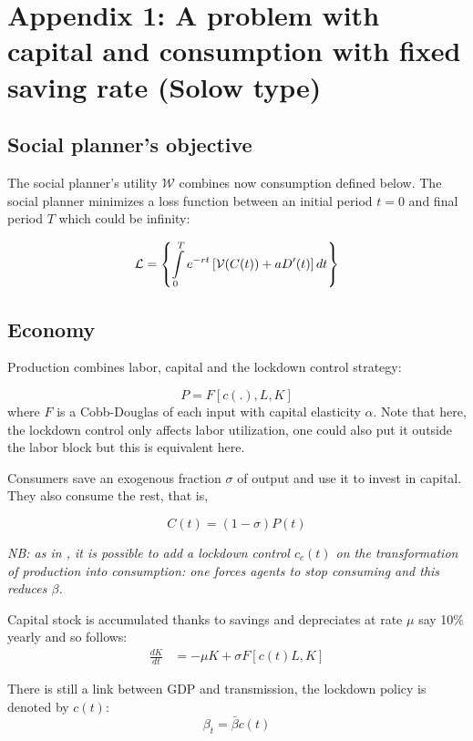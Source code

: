 \documentclass{amsart}
\begin{document}
\clearpage
\small{


}
\newpage


\section*{{Appendix 1: A problem with capital and consumption with fixed
saving rate (Solow type)}}

\subsection*{{Social planner's objective}}

{The social planner's utility $\mathcal{W}$ combines
now consumption defined below. The social planner minimizes a loss
function between an initial period $t=0$ and final period $T$ which could be infinity:}

{
\[
\mathcal{L}=\left\{ \intop_{0}^{T}e^{-rt}\left[\mathcal{V}(C(t))+aD'(t)\right]dt\right\} 
\]
}

\subsection*{{Economy }}

{Production combines labor, capital and the lockdown
control strategy:}

{
\[
P=F[c(.),L,K]
\]
 where $F$ is a Cobb-Douglas of each input with capital elasticity
$\alpha$. } {Note that here, the lockdown control only
affects labor utilization, one could also put it outside the
labor block but this is equivalent here.}

{Consumers save an exogenous fraction $\sigma$ of
output and use it to invest in capital. They also consume the rest,
that is, }

{
\[
C(t)=(1-\sigma)P(t)
\]
}

\textit{{NB: as in \cite{jones2020optimal}, it is possible to add a lockdown control $c_{c}(t)$ on the transformation of production
into consumption: one forces agents to stop consuming and this reduces
$\beta$.}}

{Capital stock is accumulated thanks to savings and
depreciates at rate $\mu$ say 10\% yearly and so follows:
\begin{align*}
\frac{dK}{dt} & =-\mu K+\sigma F[c(t)L,K]
\end{align*}
}

{There is still a link between GDP and transmission,
the lockdown policy is denoted by $c(t)$:
\[
\beta_{t}=\bar{\beta}c(t)
\]
}
\end{document}
